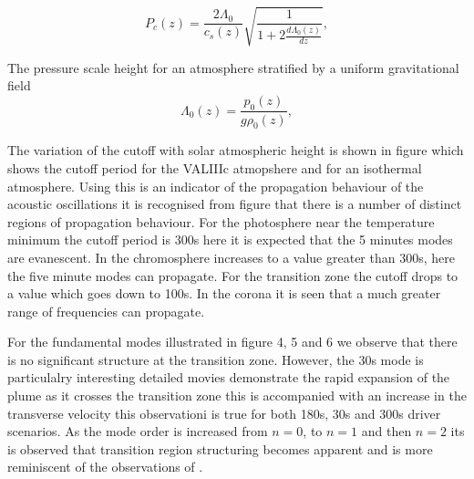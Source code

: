 \documentclass{aa}
\begin{document}
\begin{equation}\label{cutoff}
P_{c}(z)=\frac{   2\Lambda_0   }{ c_{s}(z)}   \sqrt{\frac{1}{1+2\frac{d\Lambda_0(z)}{dz}}} ,
\end{equation}

The pressure scale height for an atmosphere stratified by a uniform gravitational field
\begin{equation}\label{lambda0}
\Lambda_0(z)=\frac{p_0(z)}{g\rho_0(z)} ,
\end{equation}

The variation of the cutoff with solar atmospheric height is shown in figure 
 which shows the cutoff period for the VALIIIc atmopshere and for an isothermal atmosphere. Using this is an indicator of the propagation behaviour of the acoustic oscillations it is recognised from figure  that there is a number of distinct regions of propagation behaviour. For the photosphere near the temperature minimum  the cutoff period is 300s here it is expected that the 5 minutes modes are evanescent. In the chromosphere increases to a value greater than 300s, here the five minute modes can propagate. For the transition zone the cutoff drops to a value which goes down to 100s. In the corona it is seen that a much greater range of frequencies can propagate.

For the fundamental modes  illustrated in figure 4, 5 and 6 we observe that there is no significant structure at the transition zone. However, the 30s mode is particulalry interesting detailed movies demonstrate the rapid expansion of the plume as it crosses the transition zone this is accompanied with an increase in the transverse velocity this observationi is true for both 180s, 30s and 300s driver scenarios. As the mode order is increased from $n=0$, to $n=1$ and then $n=2$ its is observed that transition region structuring becomes apparent and is more reminiscent of the observations of \cite{Malins2007B}.
\end{document}
